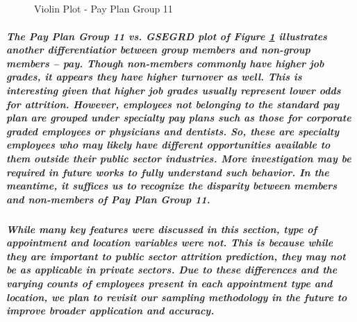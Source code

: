 \documentclass[10pt]{article}
\begin{document}
\subparagraph{}
\begin{figure}[H]
\centering
{}
\caption{Violin Plot - Pay Plan Group 11}
\label{fig:ViolinPPGROUP}
\end{figure}

\subparagraph{The Pay Plan Group 11 vs. GSEGRD plot of Figure \ref{fig:ViolinPPGROUP} illustrates another differentiatior between group members and non-group members -- pay. Though non-members commonly have higher job grades, it appears they have higher turnover as well. This is interesting given that higher job grades usually represent lower odds for attrition. However, employees not belonging to the standard pay plan are grouped under specialty pay plans such as those for corporate graded employees or physicians and dentists. So, these are specialty employees who may likely have different opportunities available to them outside their public sector industries. More investigation may be required in future works to fully understand such behavior. In the meantime, it suffices us to recognize the disparity between members and non-members of Pay Plan Group 11.}

\subparagraph{While many key features were discussed in this section, type of appointment and location variables were not. This is because while they are important to public sector attrition prediction, they may not be as applicable in private sectors. Due to these differences and the varying counts of employees present in each appointment type and location, we plan to revisit our sampling methodology in the future to improve broader application and accuracy.}
\end{document}
